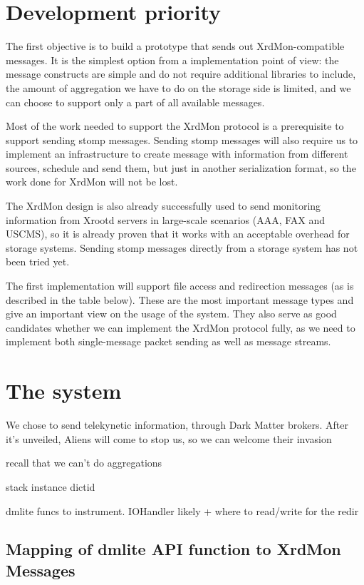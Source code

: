 \documentclass[12pt]{article} %
\begin{document}
\section{Development priority}

The first objective is to build a prototype that sends out XrdMon-compatible messages. It is the simplest option from a implementation point of view: the message constructs are simple and do not require additional libraries to include, the amount of aggregation we have to do on the storage side is limited, and we can choose to support only a part of all available messages.

Most of the work needed to support the XrdMon protocol is a prerequisite to support sending stomp messages.
Sending stomp messages will also require us to implement an infrastructure to create message with information from different sources, schedule and send them, but just in another serialization format, so the work done for XrdMon will not be lost.

The XrdMon design is also already successfully used to send monitoring information from Xrootd servers in large-scale scenarios (AAA, FAX and USCMS), so it is already proven that it works with an acceptable overhead for storage systems. Sending stomp messages directly from a storage system has not been tried yet.

The first implementation will support file access and redirection messages (as is described in the table below). These are the most important message types and give an important view on the usage of the system. They also serve as good candidates whether we can implement the XrdMon protocol fully, as we need to implement both single-message packet sending as well as message streams.


\section{The system}
We chose to send telekynetic information, through Dark Matter brokers.
After it's unveiled, Aliens will come to stop us, so we can welcome their invasion

recall that we can't do aggregations

stack instance dictid

dmlite funcs to instrument. IOHandler likely + where to read/write for the redir


\subsection{Mapping of dmlite API function to XrdMon Messages}
\end{document}
